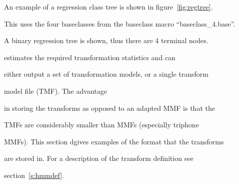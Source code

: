 An example of a regression class tree is shown in figure~\ref{fig:regtree}.


This uses the four baseclasses from the baseclass macro ``baseclass\_4.base''.


A binary regression tree is shown, thus there are 4 terminal nodes. 










 estimates the required transformation statistics and can


either output a set of transformation models, or a single transform


model file (TMF). The advantage


in storing the transforms as opposed to an adapted MMF is that the


TMFs are considerably smaller than MMFs (especially triphone


MMFs). This section dgives examples of the format that the transforms


are stored in. For a description of the transform definition see


section~\ref{s:hmmdef}.





\noindent





